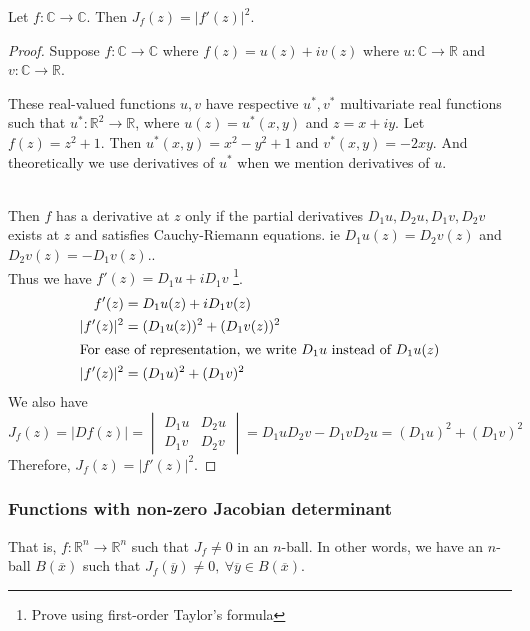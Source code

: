 \begin{theorem}
	Let $f : \mathbb{C} \to \mathbb{C}$. Then $J_f(z) = |f'(z)|^2$.
\end{theorem}
\begin{proof}
	Suppose $f : \mathbb{C} \to \mathbb{C}$ where $f(z) = u(z) + iv(z)$ where $u : \mathbb{C} \to \mathbb{R}$ and $v : \mathbb{C} \to \mathbb{R}$. \begin{commentary}These real-valued functions $u,v$ have respective $u^*,v^*$ multivariate real functions such that $u^* : \mathbb{R}^2 \to \mathbb{R}$, where $u(z) = u^*(x,y)$ and $z = x+iy$. Let $f(z) = z^2+1$. Then $u^*(x,y) = x^2-y^2+1$ and $v^*(x,y) = -2xy$. And theoretically we use derivatives of $u^*$ when we mention derivatives of $u$.\end{commentary}\\

	Then $f$ has a derivative at $z$ only if the partial derivatives $D_1u,D_2u,D_1v,D_2v$ exists at $z$ and satisfies Cauchy-Riemann equations. ie $D_1u(z) = D_2v(z)$ and $D_2v(z) = -D_1v(z)$.\cite[Theorem 5.22]{apostol}.\\
		
	Thus we have $f'(z) = D_1u + iD_1v$ \cite[Theorem 12.6]{apostol}\footnote{Prove using first-order Taylor's formula}.
	\begin{align*}
		f'(z) & = D_1u(z) + iD_1v(z) \\
		|f'(z)|^2 & = (D_1u(z))^2 + (D_1v(z))^2\\
		\intertext{For ease of representation, we write $D_1u$ instead of $D_1u(z)$}
		|f'(z)|^2 & = (D_1u)^2 + (D_1v)^2
	\end{align*}
	We also have
	\[ J_f(z) = |Df(z)| = \begin{vmatrix} D_1u & D_2u \\ D_1v & D_2v \end{vmatrix} = D_1uD_2v - D_1vD_2u = (D_1u)^2 + (D_1v)^2 \]
	Therefore, $J_f(z) = |f'(z)|^2$.
\end{proof}
\subsubsection{Functions with non-zero Jacobian determinant}
\begin{commentary}
	That is, $f : \mathbb{R}^n \to \mathbb{R}^n$ such that $J_f \ne 0$ in an $n$-ball. In other words, we have an $n$-ball $B(\overline{x})$ such that $J_f(\overline{y}) \ne 0,\ \forall \overline{y} \in B(\overline{x})$.
\end{commentary}

